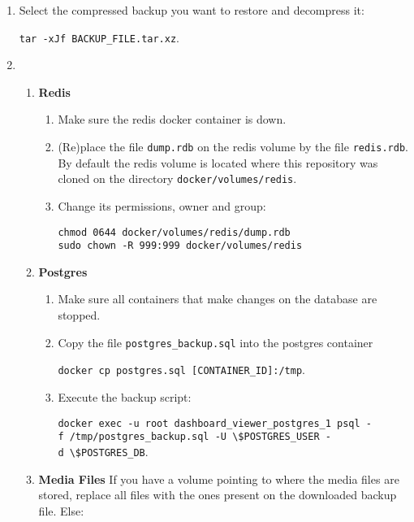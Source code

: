 \documentclass[
]{book}
\begin{document}
\begin{enumerate}
\def\labelenumi{\arabic{enumi}.}
\item
  Select the compressed backup you want to restore and decompress it:

  \texttt{tar\ -xJf\ BACKUP\_FILE.tar.xz}.
\item
  \begin{enumerate}
  \def\labelenumii{\arabic{enumii}.}
  \item
    \textbf{Redis}

    \begin{enumerate}
    \def\labelenumiii{\arabic{enumiii}.}
    \item
      Make sure the redis docker container is down.
    \item
      (Re)place the file \texttt{dump.rdb} on the redis volume by the file \texttt{redis.rdb}. By default the redis volume is located where this repository was cloned on the directory \texttt{docker/volumes/redis}.
    \item
      Change its permissions, owner and group:

\begin{verbatim}
chmod 0644 docker/volumes/redis/dump.rdb
sudo chown -R 999:999 docker/volumes/redis
\end{verbatim}
    \end{enumerate}
  \item
    \textbf{Postgres}

    \begin{enumerate}
    \def\labelenumiii{\arabic{enumiii}.}
    \item
      Make sure all containers that make changes on the database are stopped.
    \item
      Copy the file \texttt{postgres\_backup.sql} into the postgres container

      \texttt{docker\ cp\ postgres.sql\ {[}CONTAINER\_ID{]}:/tmp}.
    \item
      Execute the backup script:

      \texttt{docker\ exec\ -u\ root\ dashboard\_viewer\_postgres\_1\ psql\ -f\ /tmp/postgres\_backup.sql\ -U\ \textbackslash{}\$POSTGRES\_USER\ -d\ \textbackslash{}\$POSTGRES\_DB}.
    \end{enumerate}
  \item
    \textbf{Media Files} If you have a volume pointing to where the media files are stored, replace all files with the ones present on the downloaded backup file. Else:


\end{enumerate}
\end{enumerate}
\end{document}
